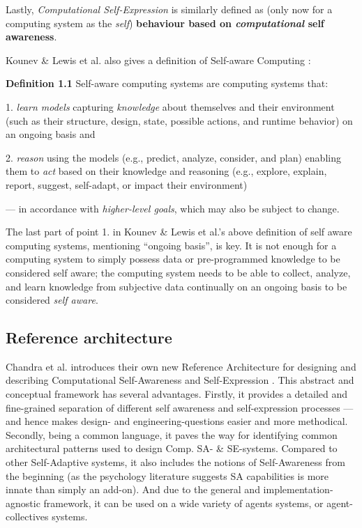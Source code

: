 	Lastly, \textit{Computational Self-Expression} is similarly defined as  (only now for a computing system as the \textit{self}) \textbf{behaviour based on \textit{computational} self awareness}.
	\newline

	Kounev \& Lewis et al. also gives a definition of Self-aware Computing \cite{sacs17_ch1}:

	\textbf{Definition 1.1} Self-aware computing systems are computing systems that:

	1. \textit{learn models} capturing \textit{knowledge} about themselves and their environment (such as their structure, design, state, possible actions, and runtime behavior) on an ongoing basis and

	2. \textit{reason} using the models (e.g., predict, analyze, consider, and plan) enabling them to \textit{act} based on their knowledge and reasoning (e.g., explore, explain, report, suggest, self-adapt, or impact their environment)

	— in accordance with \textit{higher-level goals}, which may also be subject to change.

	The last part of point 1. in Kounev \& Lewis et al.'s above definition of self aware computing systems, mentioning ``ongoing basis'', is key. It is not enough for a computing system to simply possess data or pre-programmed knowledge to be considered self aware; the computing system needs to be able to collect, analyze, and learn knowledge from subjective data continually on an ongoing basis to be considered \textit{self aware}.

	\subsection{Reference architecture}
	\label{ref_archit}

	Chandra et al. introduces their own new Reference Architecture for designing and describing Computational Self-Awareness and Self-Expression \cite{sacs16_ch4}. This abstract and conceptual framework has several advantages. Firstly, it provides a detailed and fine-grained separation of different self awareness and self-expression processes — and hence makes design- and engineering-questions easier and more methodical. Secondly, being a common language, it paves the way for identifying common architectural patterns used to design Comp. SA- \& SE-systems. Compared to other Self-Adaptive systems, it also includes the notions of Self-Awareness from the beginning (as the psychology literature suggests SA capabilities is more innate than simply an add-on). And due to the general and implementation-agnostic framework, it can be used on a wide variety of agents systems, or agent-collectives systems.

